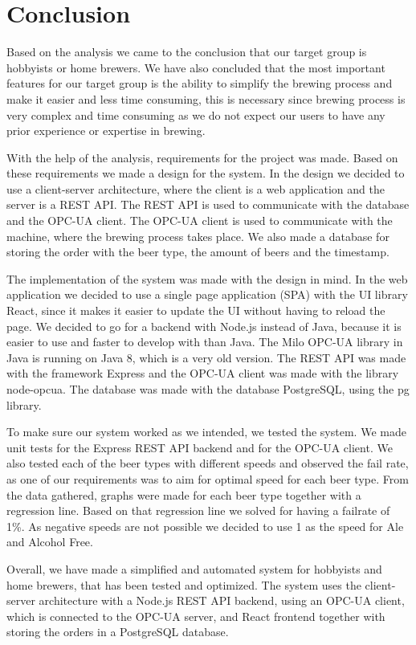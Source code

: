 \section{Conclusion}
Based on the analysis we came to the conclusion that our target group is hobbyists or home brewers.
We have also concluded that the most important features for our target group is the ability to simplify the brewing process and
make it easier and less time consuming, this is necessary since brewing process is very complex and time consuming
as we do not expect our users to have any prior experience or expertise in brewing.\newline

With the help of the analysis, requirements for the project was made.
Based on these requirements we made a design for the system.
In the design we decided to use a client-server architecture, where the client is a web application and the server is a REST API.
The REST API is used to communicate with the database and the OPC-UA client.
The OPC-UA client is used to communicate with the machine, where the brewing process takes place.
We also made a database for storing the order with the beer type, the amount of beers and the timestamp.\newline

The implementation of the system was made with the design in mind.
In the web application we decided to use a single page application (SPA) with the UI library React,
since it makes it easier to update the UI without having to reload the page.
We decided to go for a backend with Node.js instead of Java, because it is easier to use and faster to develop with than Java.
The Milo OPC-UA library in Java is running on Java 8, which is a very old version.
The REST API was made with the framework Express and the OPC-UA client was made with the library node-opcua.
The database was made with the database PostgreSQL, using the pg library.\newline

To make sure our system worked as we intended, we tested the system.
We made unit tests for the Express REST API backend and for the OPC-UA client.
We also tested each of the beer types with different speeds and observed the fail rate,
as one of our requirements was to aim for optimal speed for each beer type.
From the data gathered, graphs were made for each beer type together with a regression line.
Based on that regression line we solved for having a failrate of 1\%.
As negative speeds are not possible we decided to use 1 as the speed for Ale and Alcohol Free.\newline

Overall, we have made a simplified and automated system for hobbyists and home brewers,
that has been tested and optimized. The system uses the client-server architecture with a Node.js REST API backend,
using an OPC-UA client, which is connected to the OPC-UA server, and React frontend together with storing the orders in a PostgreSQL database.